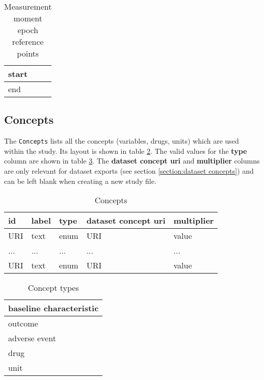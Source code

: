 \documentclass[a4paper,10pt]{article}
\begin{document}
\begin{table}[!h]
  \centering
  \caption{Measurement moment epoch reference points}
  \label{table:Measurement moment epoch reference points}
  \begin{tabular}{|l|}
    \hline
    start \\ \hline
    end \\ \hline
  \end{tabular}
\end{table}


\subsection{Concepts} \label{section:concepts}
The \texttt{Concepts} lists all the concepts (variables, drugs, units) which are used within the study. Its layout is shown in table \ref{table:Concepts}. The valid values for the \textbf{type} column are shown in table \ref{table:Concept types}. The \textbf{dataset concept uri} and \textbf{multiplier} columns are only relevant for dataset exports (see section \ref{section:dataset concepts}) and can be left blank when creating a new study file. 


\begin{table}[!h]
  \centering
  \caption{Concepts}
  \label{table:Concepts}
  \begin{tabular}{|l|l|l|l|l|}
    \hline
    \textbf{id} & \textbf{label} & \textbf{type} & \textbf{dataset concept uri} & \textbf{multiplier} \\ \hline
    URI         & text           & enum          & URI                          & value               \\ \hline
    ...         & ...            & ...           & ...                          & ...                 \\ \hline
    URI         & text           & enum          & URI                          & value               \\ \hline
  \end{tabular}
\end{table}

\begin{table}[!h]
  \centering
  \caption{Concept types}
  \label{table:Concept types}
  \begin{tabular}{|l|}
    \hline
    baseline characteristic \\ \hline
    outcome \\ \hline
    adverse event \\ \hline
    drug \\ \hline
    unit \\ \hline
  \end{tabular}
\end{table}
\end{document}
